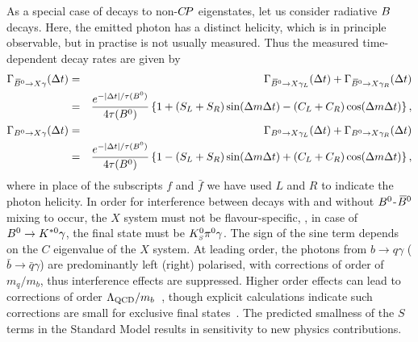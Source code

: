 \label{sec:cp_uta:notations:non_cp:radiative}

As a special case of decays to non-$C\!P$ eigenstates,
let us consider radiative $B$ decays.
Here, the emitted photon has a distinct helicity,
which is in principle observable, but in practise is not usually measured.
Thus the measured time-dependent decay rates 
are given by~\cite{Atwood:1997zr,Atwood:2004jj}
\begin{eqnarray}
  \Gamma_{\kern 0.18em\overline{\kern -0.18em B}{}^0 \to X \gamma} (\Delta t) & = &
  \Gamma_{\kern 0.18em\overline{\kern -0.18em B}{}^0 \to X \gamma_L} (\Delta t) + \Gamma_{\kern 0.18em\overline{\kern -0.18em B}{}^0 \to X \gamma_R} (\Delta t) \\ \nonumber
  & = &
  \frac{e^{-\left| \Delta t \right| / \tau(B^0)}}{4\tau(B^0)} 
  \left\{ 
    1 + 
    \left( S_L + S_R \right) \sin(\Delta m \Delta t) - 
    \left( C_L + C_R \right) \cos(\Delta m \Delta t) 
  \right\},
  \\
  \Gamma_{B^0 \to X \gamma} (\Delta t) & = & 
  \Gamma_{B^0 \to X \gamma_L} (\Delta t) + \Gamma_{B^0 \to X \gamma_R} (\Delta t) \\ \nonumber 
  & = &
  \frac{e^{-\left| \Delta t \right| / \tau(B^0)}}{4\tau(B^0)} 
  \left\{ 
    1 - 
    \left( S_L + S_R \right) \sin(\Delta m \Delta t) + 
    \left( C_L + C_R \right) \cos(\Delta m \Delta t) 
  \right\},
\end{eqnarray}
where in place of the subscripts $f$ and $\bar{f}$ we have used $L$ and $R$
to indicate the photon helicity.
In order for interference between decays with and without $B^0$-$\kern 0.18em\overline{\kern -0.18em B}{}^0$ mixing
to occur, the $X$ system must not be flavour-specific,
\eg, in case of $B^0 \to K^{*0}\gamma$, the final state must be $K^0_{\scriptscriptstyle S} \pi^0 \gamma$.
The sign of the sine term depends on the $C$ eigenvalue of the $X$ system.
At leading order, the photons from 
$b \to q \gamma$ ($\bar{b} \to \bar{q} \gamma$) are predominantly
left (right) polarised, with corrections of order of $m_q/m_b$,
thus interference effects are suppressed.
Higher order effects can lead to corrections of order 
$\Lambda_{\rm QCD}/m_b$~\cite{Grinstein:2004uu,Grinstein:2005nu},
though explicit calculations indicate such corrections are small
for exclusive final states~\cite{Matsumori:2005ax,Ball:2006cva}.
The predicted smallness of the $S$ terms in the Standard Model
results in sensitivity to new physics contributions.

